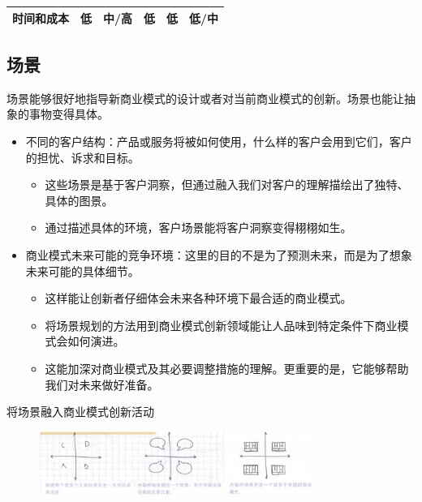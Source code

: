 \begin{table}[H]
{\begin{tabular}{|l|l|l|l|l|l|}
            时间和成本 & 低                                                                      & 中/高                                                                               & 低                                                                   & 低                                                                       & 低/中                                                                    \\ \hline
            \end{tabular}
    }
    \end{table}


\subsection{场景}

场景能够很好地指导新商业模式的设计或者对当前商业模式的创新。场景也能让抽象的事物变得具体。
\begin{itemize}
    \item 不同的客户结构：产品或服务将被如何使用，什么样的客户会用到它们，客户的担忧、诉求和目标。
    \begin{itemize}
        \item 这些场景是基于客户洞察，但通过融入我们对客户的理解描绘出了独特、具体的图景。
        \item 通过描述具体的环境，客户场景能将客户洞察变得栩栩如生。
    \end{itemize}
    \item 商业模式未来可能的竞争环境：这里的目的不是为了预测未来，而是为了想象未来可能的具体细节。
    \begin{itemize}
        \item 这样能让创新者仔细体会未来各种环境下最合适的商业模式。
        \item 将场景规划的方法用到商业模式创新领域能让人品味到特定条件下商业模式会如何演进。
        \item 这能加深对商业模式及其必要调整措施的理解。更重要的是，它能够帮助我们对未来做好准备。
    \end{itemize}
\end{itemize}

将场景融入商业模式创新活动
\begin{figure}[H]
	\centering
	\vspace{-0.5em}
	\includegraphics[width=0.8\textwidth]{img/将场景融入商业模式创新活动.png}
    \vspace{-0.5em}
\end{figure}

